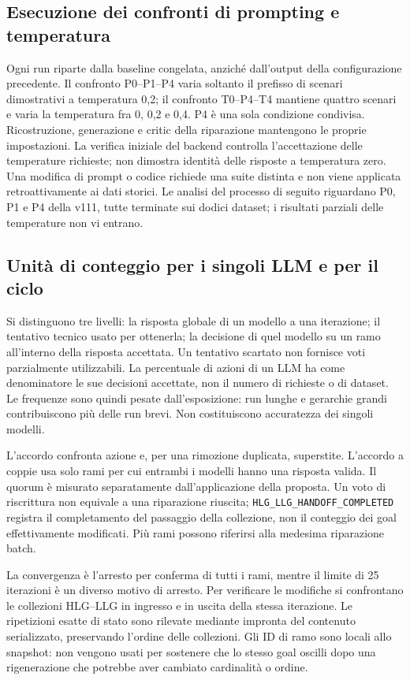 \subsection{Esecuzione dei confronti di prompting e temperatura}
Ogni run riparte dalla baseline congelata, anzich\'e dall'output della
configurazione precedente. Il confronto P0--P1--P4 varia soltanto
il prefisso di scenari dimostrativi a temperatura 0,2; il confronto
T0--P4--T4 mantiene quattro scenari e varia la temperatura fra
0, 0,2 e 0,4. P4 \`e una sola condizione condivisa. Ricostruzione,
generazione e critic della riparazione mantengono le proprie impostazioni.
La verifica iniziale del backend controlla l'accettazione delle
temperature richieste; non dimostra identit\`a delle risposte a temperatura zero.
Una modifica di prompt o codice richiede una suite distinta e non viene
applicata retroattivamente ai dati storici. Le analisi del processo
di seguito riguardano P0, P1 e P4 della v111, tutte terminate sui dodici
dataset; i risultati parziali delle temperature non vi entrano.

\subsection{Unit\`a di conteggio per i singoli LLM e per il ciclo}
Si distinguono tre livelli: la risposta globale di un modello a una
iterazione; il tentativo tecnico usato per ottenerla; la decisione
di quel modello su un ramo all'interno della risposta accettata.
Un tentativo scartato non fornisce voti parzialmente utilizzabili.
La percentuale di azioni di un LLM ha come denominatore le sue decisioni
accettate, non il numero di richieste o di dataset. Le frequenze sono
quindi pesate dall'esposizione: run lunghe e gerarchie grandi contribuiscono
pi\`u delle run brevi. Non costituiscono accuratezza dei singoli modelli.

L'accordo confronta azione e, per una rimozione duplicata, superstite.
L'accordo a coppie usa solo rami per cui entrambi i modelli hanno una
risposta valida. Il quorum \`e misurato separatamente dall'applicazione
della proposta. Un voto di riscrittura non equivale a una riparazione
riuscita; \texttt{HLG\_LLG\_HANDOFF\_COMPLETED} registra il completamento
del passaggio della collezione, non il conteggio dei goal effettivamente
modificati. Pi\`u rami possono riferirsi alla medesima riparazione batch.

La convergenza \`e l'arresto per conferma di tutti i rami, mentre il
limite di 25 iterazioni \`e un diverso motivo di arresto. Per verificare
le modifiche si confrontano le collezioni HLG--LLG in ingresso e in
uscita della stessa iterazione. Le ripetizioni esatte di stato sono
rilevate mediante impronta del contenuto serializzato, preservando
l'ordine delle collezioni. Gli ID di ramo sono locali allo snapshot:
non vengono usati per sostenere che lo stesso goal oscilli dopo una
rigenerazione che potrebbe aver cambiato cardinalit\`a o ordine.
